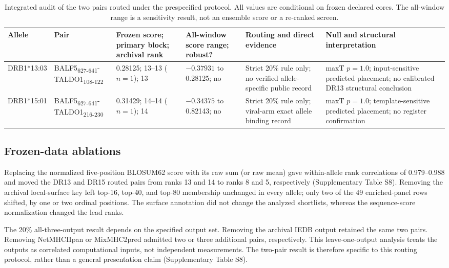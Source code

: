 \documentclass[11pt]{article}
\begin{document}
\begin{table}[H]
\centering
\scriptsize
\caption{Integrated audit of the two pairs routed under the prespecified protocol. All values are conditional on frozen declared cores. The all-window range is a sensitivity result, not an ensemble score or a re-ranked screen.}
\label{tab:lead-audit}
\setlength{\tabcolsep}{3pt}\renewcommand{\arraystretch}{1.18}
\begin{tabular}{p{}p{}p{}p{}p{}p{}}
\toprule
Allele & Pair & Frozen score; primary block; archival rank & All-window score range; robust? & Routing and direct evidence & Null and structural interpretation \\\midrule
DRB1*13:03 & BALF5\textsubscript{627-641}-TALDO1\textsubscript{108-122} & 0.28125; 13--13 ($n=1$); 13 & $-0.37931$ to 0.28125; no & Strict 20\% rule only; no verified allele-specific public record & maxT $p=1.0$; input-sensitive predicted placement; no calibrated DR13 structural conclusion\\
DRB1*15:01 & BALF5\textsubscript{627-641}-TALDO1\textsubscript{216-230} & 0.31429; 14--14 ($n=1$); 14 & $-0.34375$ to 0.82143; no & Strict 20\% rule only; viral-arm exact allele binding record & maxT $p=1.0$; template-sensitive predicted placement; no register confirmation\\
\bottomrule
\end{tabular}
\end{table}

\subsection{Frozen-data ablations}
Replacing the normalized five-position BLOSUM62 score with its raw sum (or raw mean) gave within-allele rank correlations of 0.979--0.988 and moved the DR13 and DR15 routed pairs from ranks 13 and 14 to ranks 8 and 5, respectively (Supplementary Table S8). Removing the archival local-surface key left top-16, top-40, and top-80 membership unchanged in every allele; only two of the 49 enriched-panel rows shifted, by one or two ordinal positions. The surface annotation did not change the analyzed shortlists, whereas the sequence-score normalization changed the lead ranks.

The 20\% all-three-output result depends on the specified output set. Removing the archival IEDB output retained the same two pairs. Removing NetMHCIIpan or MixMHC2pred admitted two or three additional pairs, respectively. This leave-one-output analysis treats the outputs as correlated computational inputs, not independent measurements. The two-pair result is therefore specific to this routing protocol, rather than a general presentation claim (Supplementary Table S8).
\end{document}
